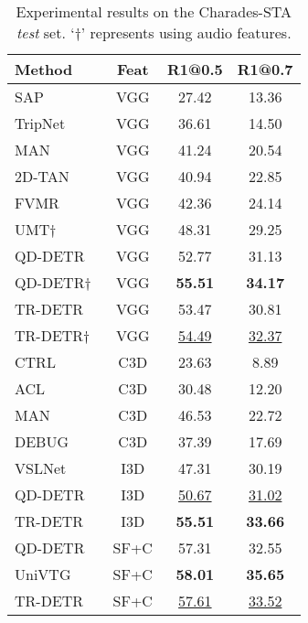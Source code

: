 \begin{table}[!ht]
    \centering
    \small
    \begin{tabular}{lccc}
        \toprule
        \textbf{Method} & \textbf{Feat} & R1@0.5 & R1@0.7 \\
        \midrule
        SAP~\cite{DBLP:conf/aaai/ChenJ19a} & VGG & 27.42 & 13.36 \\
        TripNet~\cite{DBLP:conf/bmvc/HahnKRG20} & VGG & 36.61 & 14.50 \\
        MAN~\cite{DBLP:conf/cvpr/ZhangDWWD19} & VGG & 41.24 & 20.54 \\
        2D-TAN~\cite{zhang2020learning} & VGG & 40.94 & 22.85 \\
        FVMR~\cite{li2021align} & VGG & 42.36 & 24.14 \\
        UMT†~\cite{liu2022umt} & VGG & 48.31 & 29.25 \\
        QD-DETR~\cite{moon2023query} & VGG & 52.77 & 31.13 \\
        QD-DETR†~\cite{moon2023query} & VGG & \textbf{55.51} & \textbf{34.17} \\
        \rowcolor[rgb]{0.78,0.78,0.78} TR-DETR & VGG & 53.47 & 30.81 \\
        \rowcolor[rgb]{0.78,0.78,0.78} TR-DETR† & VGG & \underline{54.49} & \underline{32.37} \\
        \midrule
        CTRL~\cite{gao2017tall} & C3D & 23.63 & 8.89 \\
        ACL~\cite{DBLP:conf/wacv/GeGCN19} & C3D & 30.48 & 12.20 \\
        MAN~\cite{DBLP:conf/cvpr/ZhangDWWD19} & C3D & 46.53 & 22.72 \\
        DEBUG~\cite{DBLP:conf/emnlp/LuCTLX19} & C3D & 37.39 & 17.69 \\
        VSLNet~\cite{zhang2021natural} & I3D & 47.31 & 30.19 \\
        QD-DETR~\cite{moon2023query} & I3D & \underline{50.67} & \underline{31.02} \\
        \rowcolor[rgb]{0.78,0.78,0.78} TR-DETR & I3D & \textbf{55.51} & \textbf{33.66} \\
        \midrule
        QD-DETR~\cite{moon2023query} & SF+C & 57.31 & 32.55 \\
        UniVTG~\cite{DBLP:journals/corr/abs-2307-16715} & SF+C & \textbf{58.01} & \textbf{35.65} \\
        \rowcolor[rgb]{0.78,0.78,0.78} TR-DETR & SF+C & \underline{57.61} & \underline{33.52} \\
        \bottomrule
    \end{tabular}
    \caption{Experimental results on the Charades-STA \emph{test} set. `†' represents using audio features.}
    \label{results_CHA}
\end{table}

